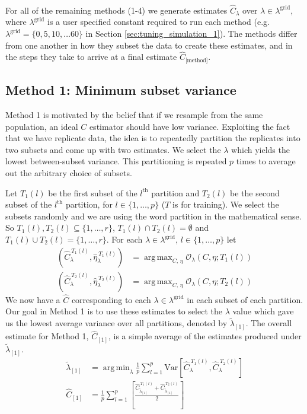 \documentclass[oupdraft]{bio}
\DeclareMathOperator*{\argmin}{arg\,min}
\DeclareMathOperator*{\argmax}{arg\,max}
\newcommand{\lambdagrid}{\lambda^{\text{grid}}}
\begin{document}
\ \\

For all of the remaining methods (1-4) we generate estimates $\widehat{C}_\lambda$ over $\lambda \in \lambda^{\text{grid}}$, where $\lambdagrid$ is a user specified constant required to run each method (e.g. $\lambdagrid = \{0, 5, 10, \dots 60\}$ in Section \ref{sec:tuning_simulation_1}).  The methods differ from one another in how they subset the data to create these estimates, and in the steps they take to arrive at a final estimate $\widehat{C}_{\text{[method]}}$.

%
%
\subsection{Method 1: Minimum subset variance}
Method 1 is motivated by the belief that if we resample from the same population, an ideal $C$ estimator should have low variance.  Exploiting the fact that we have replicate data, the idea is to repeatedly partition the replicates into two subsets and come up with two estimates.  We select the $\lambda$ which yields the lowest between-subset variance.  This partitioning is repeated $p$ times to average out the arbitrary choice of subsets.

Let $T_1(l)$ be the first subset of the $l^{\text{th}}$ partition and $T_2(l)$ be the second subset of the $l^{\text{th}}$ partition, for $l \in \{1, \dots , p\}$ ($T$ is for training).  We select the subsets randomly and we are using the word partition in the mathematical sense.  So $T_1(l), T_2(l) \subseteq \{1, \dots , r\}$, $T_1(l) \cap T_2(l) = \emptyset$ and $T_1(l) \cup T_2(l) = \{1, \dots ,r\}$.  For each $\lambda \in \lambda^{\text{grid}}$, $l \in \{1, \dots, p\}$ let
\begin{align}
\left(\widehat{C}_{\lambda}^{ \ T_1(l)}, \widehat{\eta}_{\lambda}^{ \ T_1(l)} \right) &= \argmax_{C, \, \eta} \mathcal{O}_\lambda \left(C, \eta; T_1(l) \right) \\
\left(\widehat{C}_{\lambda}^{ \ T_2(l)}, \widehat{\eta}_{\lambda}^{ \ T_2(l)} \right) &= \argmax_{C, \, \eta} \mathcal{O}_\lambda \left(C, \eta; T_2(l) \right) 
\end{align}
We now have a $\widehat{C}$ corresponding to each $\lambda \in \lambdagrid$ in each subset of each partition.  Our goal in Method 1 is to use these estimates to select the $\lambda$ value which gave us the lowest average variance over all partitions, denoted by $\widetilde{\lambda}_{[1]}$.  The overall estimate for Method 1, $\widehat{C}_{[1]}$, is a simple average of the estimates produced under $\widetilde{\lambda}_{[1]}$.
\begin{align}
\widetilde{\lambda}_{[1]} &= \argmin_{\lambda} \frac{1}{p} \sum_{l=1}^p \text{Var}\left[ \widehat{C}_{\lambda}^{ \ T_1(l)}, \widehat{C}_{\lambda}^{ \ T_2(l)} \right] \\
\widehat{C}_{[1]} &=  \frac{1}{p} \sum_{l=1}^p \left[ \frac{\widehat{C}_{\widetilde{\lambda}_{[1]}}^{ \ T_1(l)} + \widehat{C}_{\widetilde{\lambda}_{[1]}}^{ \ T_2(l)}}{2} \right]
\end{align}
\end{document}
